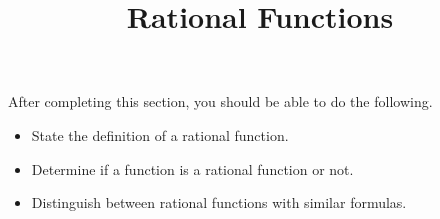 \documentclass{ximera}
\title{Rational Functions}
\begin{document}
\begin{abstract} 
\end{abstract}

\maketitle

\begin{sectionOutcomes}
After completing this section, you should be able to do the following.

\begin{itemize}
	\item State the definition of a rational function.
    \item Determine if a function is a rational function or not.
    \item Distinguish between rational functions with similar formulas.

\end{itemize}
\end{sectionOutcomes}
\end{document}
